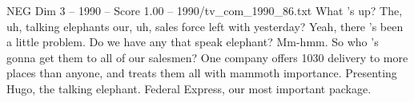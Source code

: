 \begin{textsample}{NEG Dim 3 – 1990 – Score 1.00 – 1990/tv\_com\_1990\_86.txt}  \label{ex:f3_neg_029}
What 's up?
The, uh, talking elephants our, uh, sales force left with yesterday?
Yeah, there 's been a little problem.
Do we have any that speak elephant?
Mm-hmm.
So who 's gonna get them to all of our salesmen?
One company offers 1030 delivery to more places than anyone, and treats them all with mammoth importance.
Presenting Hugo, the talking elephant.
Federal Express, our most important package.

\end{textsample}
